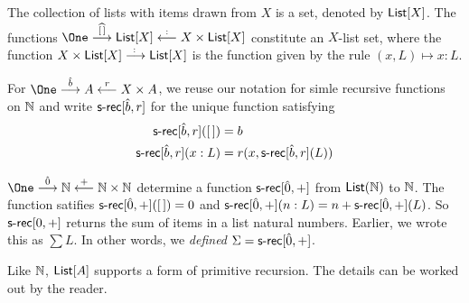 \begin{principle}
	The collection of lists with items drawn from $X$ is a set, denoted by $\mathord{\textsf{List}}[X]$.
	The functions $\One\stackrel{\widehat{[\,]}}{\longrightarrow}\List[X]\stackrel{\mathord{:}}{\longleftarrow}X\times \List[X]$
	constitute an $X$-list set, where the function $X\times \mathord{\textsf{List}}[X]\stackrel{\mathord{\colon}}{\longrightarrow}\mathord{\textsf{List}}[X]$ is the function given by the rule $(x,L)\mapsto x:L$.
	
	For $\One \stackrel{\hat b}{\longrightarrow} A \stackrel{r}{\longleftarrow} X\times A$, we reuse our notation for simle recursive functions on $\mathbb N$
	and write $\mathord{\textsf{s-rec}}[\hat b,r]$ for the unique function 
	satisfying 
	\begin{align*} 
	 \mathord{\textsf{s-rec}}[\hat b,r]([\,]) &= b\\
	 \mathord{\textsf{s-rec}}[\hat b,r](x:L)  &= r(x, \mathord{\textsf{s-rec}}[\hat b, r](L))
	\end{align*}
\end{principle}

\begin{example}
	$\One \stackrel{\hat 0}{\longrightarrow} \NN \stackrel{+}{\longleftarrow} \NN\times \NN$ determine a function $\mathord{\textsf{s-rec}}[\hat 0, +]$ from $\mathord{\textsf{List}}(\mathbb N)$ to $\mathbb N$. The function satifies $\mathord{\textsf{s-rec}}[\hat 0,+]([\,])= 0$ and $\mathord{\textsf{s-rec}}[\hat 0,+](n:L)= n + \mathord{\textsf{s-rec}}[\hat 0,+](L)$.
	So $\mathord{\textsf{s-rec}}[0,+]$ returns the sum of items in a list natural numbers.
	Earlier, we wrote this as $\sum L$. In other words, we \emph{defined} $\mathord{\Sigma} = \mathord{\textsf{s-rec}}[\hat 0,+]$.
\end{example}

Like $\mathbb N$, $\mathord{\textsf{List}}[A]$ supports a form of primitive recursion. 
The details can be worked out by the reader. 

